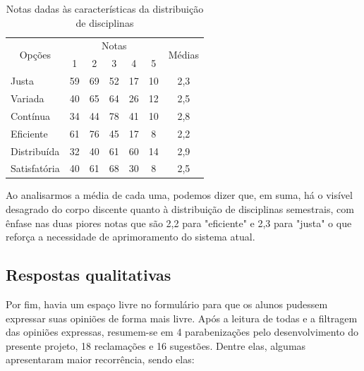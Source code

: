 \begin{table}[htbp]
  \centering
  \caption{\label{table:6.0-Opiniao}Notas dadas às características da distribuição de disciplinas}
  \begin{tabular}{| l | c c c c c | c |}
    \hline
    \multicolumn{1}{|c|}{\multirow{2}{*}{Opções}} &
    \multicolumn{5}{c|}{Notas}                    &
    \multicolumn{1}{|c|}{\multirow{2}{*}{Médias}}
    \\
    \multicolumn{1}{|c|}{}                        &
    \multicolumn{1}{c|}{1}                        &
    \multicolumn{1}{c|}{2}                        &
    \multicolumn{1}{c|}{3}                        &
    \multicolumn{1}{c|}{4}                        &
    \multicolumn{1}{c|}{5}                        &
    \multicolumn{1}{|c|}{}                                                       \\
    \hline
    Justa                                         & 59 & 69 & 52 & 17 & 10 & 2,3 \\
    Variada                                       & 40 & 65 & 64 & 26 & 12 & 2,5 \\
    Contínua                                      & 34 & 44 & 78 & 41 & 10 & 2,8 \\
    Eficiente                                     & 61 & 76 & 45 & 17 & 8  & 2,2 \\
    Distribuída                                   & 32 & 40 & 61 & 60 & 14 & 2,9 \\
    Satisfatória                                  & 40 & 61 & 68 & 30 & 8  & 2,5 \\
    \hline
  \end{tabular}
\end{table}

Ao analisarmos a média de cada uma, podemos dizer que, em suma, há o visível desagrado do corpo discente quanto à distribuição de disciplinas semestrais, com ênfase nas duas piores notas que são 2,2 para "eficiente" e 2,3 para "justa" o que reforça a necessidade de aprimoramento do sistema atual.

\subsection{Respostas qualitativas} %

Por fim, havia um espaço livre no formulário para que os alunos pudessem expressar suas opiniões de forma mais livre. Após a leitura de todas e a filtragem das opiniões expressas, resumem-se em 4 parabenizações pelo desenvolvimento do presente projeto, 18 reclamações e 16 sugestões. Dentre elas, algumas apresentaram maior recorrência, sendo elas:

